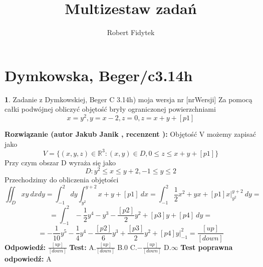 \documentclass[12pt, a4paper]{article}
\title{Multizestaw zadań}
\author{Robert Fidytek}
\date{}
\theoremstyle{definition} %
\newtheorem{zad}{}
\newcommand{\kategoria}[1]{\section{#1}} %
\newcommand{\zadStart}[1]{\begin{zad}#1\newline} %
\newcommand{\zadStop}{\end{zad}}   %
\newcommand{\rozwStart}[2]{\noindent \textbf{Rozwiązanie (autor #1 , recenzent #2): }\newline} %
\newcommand{\rozwStop}{\newline}                                            %
\newcommand{\odpStart}{\noindent \textbf{Odpowiedź:}\newline}    %
\newcommand{\odpStop}{\newline}                                             %
\newcommand{\testStart}{\noindent \textbf{Test:}\newline} %
\newcommand{\testStop}{\newline} %
\newcommand{\kluczStart}{\noindent \textbf{Test poprawna odpowiedź:}\newline} %
\newcommand{\kluczStop}{\newline} %
\begin{document}
\maketitle


\kategoria{Dymkowska, Beger/c3.14h}
\zadStart{Zadanie z Dymkowskiej, Beger C 3.14h) moja wersja nr [nrWersji]}
Za pomocą całki podwójnej obliczyć objętość bryły ograniczonej powierzchniami $$x=y^2, y=x-2, z=0, z=x+y+[p1]$$
\zadStop
\rozwStart{Jakub Janik}{}
Objętość V możemy zapisać jako
$$V=\{(x,y,z)\in\mathbb{R}^3\colon(x,y)\in D, 0 \leq z \leq x+y+[p1]\}$$
Przy czym obszar D wyraża się jako
$$D\colon y^2 \leq x \leq y+2, -1 \leq y \leq 2$$
Przechodzimy do obliczenia objętości
$$\iint_D xy\ dxdy=\int_{-1}^2dy\int_{y^2}^{y+2}x+y+[p1]\ dx=\int_{-1}^2\frac{1}{2}x^2+yx+[p1]x\Big|_{y^2}^{y+2}\ dy=$$
$$=\int_{-1}^2 -\frac{1}{2}y^4-y^3-\frac{[p2]}{2}y^2+[p3]y+[p4]\ dy=$$
$$=-\frac{1}{10}y^5-\frac{1}{4}y^4-\frac{[p2]}{6}y^3+\frac{[p3]}{2}y^2+[p4]y\Big|_{-1}^{2}=\frac{[up]}{[down]}$$
\rozwStop
\odpStart
$\frac{[up]}{[down]}$
\odpStop
\testStart
A.$\frac{[up]}{[down]}$
B.$0$
C.$-\frac{[up]}{[down]}$
D.$\infty$
\testStop
\kluczStart
A
\kluczStop
\end{document}
